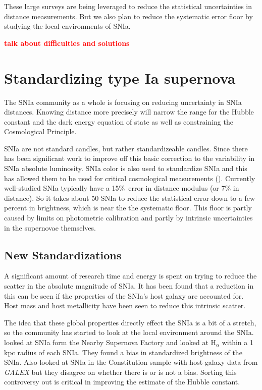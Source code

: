 \documentclass[apj, iop]{emulateapj}
\newcommand{\sn}{SNIa}
\newcommand{\todo}[1]{\textbf{\textcolor{red}{#1}}}
\begin{document}
These large surveys are being leveraged to reduce the statistical uncertainties in distance
measurements. But we also plan to reduce the systematic error floor by studying the
local environments of SNIa.

\todo{talk about difficulties and solutions}

\section{Standardizing type Ia
supernova}\label{standardizing-type-ia-supernova}

The \sn{} community as a whole is focusing on reducing uncertainty in SNIa
distances. Knowing distance more precisely will narrow the range for the Hubble
constant and the dark energy equation of state as well as
constraining the Cosmological Principle.

\sn{} are not standard candles, but rather standardizeable candles. Since
\cite{Phillips93} there has been significant work to improve off this basic correction to the
variability in \sn{} absolute luminosity. \sn{} color is also used to standardize \sn{} and
this has allowed them to be used for critical cosmological measurements
(\citep{Riess98, Perlmutter99}). Currently well-studied \sn{} typically have a
15\%\ error in distance modulus (or 7\% in distance). So it takes about 50 SNIa
to reduce the statistical error down to a few percent in brightness, which is near the 
the systematic floor. This floor is partly caused by limits on photometric calibration and
partly by intrinsic uncertainties in the supernovae themselves.

\subsection{New Standardizations}\label{new-standardizations}

A significant amount of research time and energy is spent on trying to reduce
the scatter in the absolute magnitude of SNIa. It has been found that a
reduction in this can be seen if the properties of the SNIa's host galaxy are
accounted for. Host mass \citep{Childress13} and host metallicity \citep{Hayden13}
have been seen to reduce this intrinsic scatter.

The idea that these global properties directly effect the \sn{} is a bit of a
stretch, so the community has started to look at the local environment around
the SNIa. \cite{Rigault13} looked at \sn{} form the Nearby Supernova Factory and
looked at H$_{\alpha}$ within a 1 kpc radius of each SNIa. They found  a bias in
standardized brightness of the SNIa. Also \cite{Rigault15, Jones15} looked at
\sn{} in the Constitution sample with host galaxy data from {\it GALEX} but they
disagree on whether there is or is not a bias. Sorting this controversy out is
critical in improving the estimate of the Hubble constant.
\end{document}
